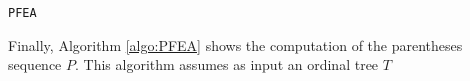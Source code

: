 \begin{algorithm}[t]
\small
\SetVlineSkip{-2cm}
  \LinesNumbered
  \SetAlgoNoEnd
  \DontPrintSemicolon
  \BlankLine%

  \caption{{\tt PFEA}}
  \label{algo:PFEA}
\end{algorithm}
\normalsize

Finally, Algorithm \ref{algo:PFEA} shows the computation of the parentheses sequence $P$. This algorithm assumes as input an ordinal tree $T$
